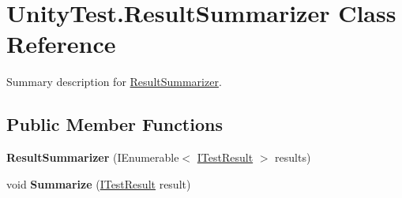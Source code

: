 \hypertarget{class_unity_test_1_1_result_summarizer}{}\section{Unity\+Test.\+Result\+Summarizer Class Reference}
\label{class_unity_test_1_1_result_summarizer}


Summary description for \hyperlink{class_unity_test_1_1_result_summarizer}{Result\+Summarizer}.  


\subsection*{Public Member Functions}
\begin{DoxyCompactItemize}
\item 
\mbox{\label{class_unity_test_1_1_result_summarizer_a5ebf0666ccc0a7954b15449bb10249bc}} 
{\bfseries Result\+Summarizer} (I\+Enumerable$<$ \hyperlink{interface_i_test_result}{I\+Test\+Result} $>$ results)
\item 
\mbox{\label{class_unity_test_1_1_result_summarizer_a1f0d05eb743ef41c2d697023592843f5}} 
void {\bfseries Summarize} (\hyperlink{interface_i_test_result}{I\+Test\+Result} result)
\end{DoxyCompactItemize}
